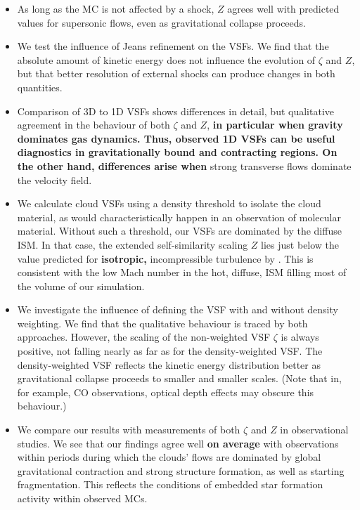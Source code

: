 \begin{itemize}
\begin{itemize}
\end{itemize}
	\item As long as the MC is not affected by a shock, $Z$ agrees well with predicted values for supersonic flows, even as gravitational collapse proceeds.
	\item We test the influence of Jeans refinement on the VSFs. We find that the absolute amount of kinetic energy does not influence the evolution of $\zeta$ and $Z$, but that better resolution of external shocks can produce changes in both quantities.
	\item Comparison of 3D to 1D VSFs shows differences in detail, but qualitative agreement in the behaviour of both $\zeta$ and $Z$, \textbf{in particular when gravity dominates gas dynamics. Thus, observed 1D VSFs can be useful diagnostics in gravitationally bound and contracting regions. On the other hand, differences arise when} strong transverse flows dominate the velocity field. 
	\item We calculate cloud VSFs using a density threshold to isolate the cloud material, as would characteristically happen in an observation of molecular material. Without such a threshold, our VSFs are dominated by the diffuse ISM. In that case, the extended self-similarity scaling $Z$ lies just below the value predicted for \textbf{isotropic,} incompressible turbulence by \citet{She1994}. This is consistent with the low Mach number in the hot, diffuse, ISM filling most of the volume of our simulation.
	\item We investigate the influence of defining the VSF with and without density weighting. We find that the qualitative behaviour is traced by both approaches. However, the scaling of the non-weighted VSF $\zeta$ is always positive, not falling nearly as far as for the density-weighted VSF. The density-weighted VSF reflects the kinetic energy distribution better as gravitational collapse proceeds to smaller and smaller scales. (Note that in, for example, CO observations, optical depth effects may obscure this behaviour.) 
	\item We compare our results with measurements of both $\zeta$ and $Z$ in observational studies. We see that our findings agree well \textbf{on average} with observations within periods during which the clouds' flows are dominated by global gravitational contraction and strong structure formation, as well as starting fragmentation. This reflects the conditions of embedded star formation activity within observed MCs.
\end{itemize}

